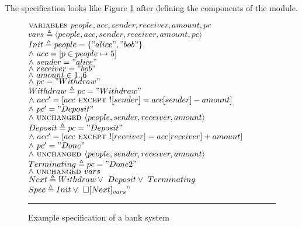 \documentclass[fleqn]{tukseminar}
\begin{document}
			The specification looks like Figure \ref{examplespec} after defining the components of the module. \\
			\begin{figure}[h]
				
				$\mbox{\textsc{variables }} people, acc, sender, receiver, amount, pc$\\
				$vars \triangleq  \langle people, acc, sender, receiver, amount, pc \rangle$\\
				
				$ Init \triangleq people = \{"alice","bob"\}$ \\
				\hspace*{0.8cm}$\land \  acc = [p \in people \mapsto 5]$\\
				\hspace*{0.8cm}$\land \   sender = "alice"$\\
				\hspace*{0.8cm}$\land \   receiver = "bob"$\\
				\hspace*{0.8cm}$\land \   amount \in 1..6 $\\
				\hspace*{0.8cm}$\land \   pc = "Withdraw"$\\
				
				$ Withdraw \triangleq pc = "Withdraw"$ \\
				\hspace*{0.8cm}$\land \   acc' = [acc \mbox{\textsc{ except }}  ![sender] = acc[sender]-amount]$\\
				\hspace*{0.8cm}$\land \   pc' = "Deposit"$\\
				\hspace*{0.8cm}$\land \  \mbox{\textsc{unchanged }} \langle people,sender,receiver,amount \rangle $\\
				
				$ Deposit \triangleq pc = "Deposit"$ \\
				\hspace*{0.8cm}$\land \   acc' = [acc \mbox{\textsc{ except }}  ![receiver] = acc[receiver]+amount]$\\
				\hspace*{0.8cm}$\land \   pc' = "Done"$\\
				\hspace*{0.8cm}$\land \  \mbox{\textsc{unchanged }} \langle people, sender, receiver, amount\rangle $\\
				
				
				$ Terminating \triangleq pc = "Done2"$ \\
				\hspace*{0.8cm}$\land \  \mbox{\textsc{unchanged }} vars $\\
				
				$ Next \triangleq Withdraw \lor \  Deposit \lor \  Terminating$ \\
				
				$ Spec \triangleq Init \lor \  \square[Next]_{vars} "$ \\
				\hrule
				\caption{Example specification of a bank system}
				\label{examplespec}
			\end{figure}
			
\end{document}

